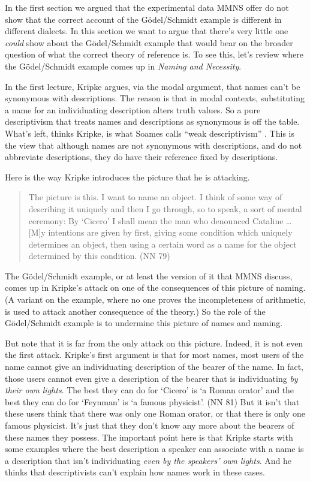 {In the first section we argued that the experimental data MMNS offer do not show that the correct account of the G\"{o}del\-/\-Schmidt example is different in different dialects. In this section we want to argue that there's very little one \textit{could} show about the G\"{o}del\-/\-Schmidt example that would bear on the broader question of what the correct theory of reference is. To see this, let's review where the G\"{o}del\-/\-Schmidt example comes up in \textit{Naming and Necessity}.

In the first lecture, Kripke argues, via the modal argument, that names can't be synonymous with descriptions. The reason is that in modal contexts, substituting a name for an individuating description alters truth values. So a pure descriptivism that treats names and descriptions as synonymous is off the table. What's left, thinks Kripke, is what Soames calls ``weak descriptivism'' \cite[Volume II, 356]{Soames2003}. This is the view that although names are not synonymous with descriptions, and do not abbreviate descriptions, they do have their reference fixed by descriptions.} Here is the way Kripke introduces the picture that he is attacking.

\begin{quote}
The picture is this. I want to name an object. I think of some way of describing it uniquely and then I go through, so to speak, a sort of mental ceremony: By `Cicero' I shall mean the man who denounced Cataline {\dots} [M]y intentions are given by first, giving some condition which uniquely determines an object, then using a certain word as a name for the object determined by this condition. (NN 79)
\end{quote}

The G\"{o}del\-/\-Schmidt example, or at least the version of it that MMNS discuss, comes up in Kripke's attack on one of the consequences of this picture of naming. (A variant on the example, where no one proves the incompleteness of arithmetic, is used to attack another consequence of the theory.) So the role of the G\"{o}del\-/\-Schmidt example is to undermine this picture of names and naming.

But note that it is far from the only attack on this picture. Indeed, it is not even the first attack. Kripke's first argument is that for most names, most users of the name cannot give an individuating description of the bearer of the name. In fact, those users cannot even give a description of the bearer that is individuating \textit{by their own lights}. The best they can do for `Cicero' is `a Roman orator' and the best they can do for `Feynman' is `a famous physicist'. (NN 81) But it isn't that these users think that there was only one Roman orator, or that there is only one famous physicist. It's just that they don't know any more about the bearers of these names they possess. The important point here is that Kripke starts with some examples where the best description a speaker can associate with a name is a description that isn't individuating \textit{even by the speakers' own lights}. And he thinks that descriptivists can't explain how names work in these cases.

